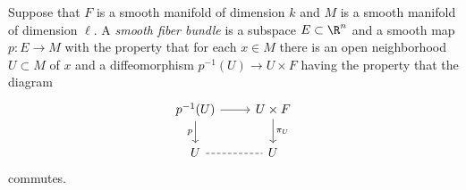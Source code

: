 \documentclass[11pt,letterpaper]{article}
\begin{document}
\begin{problem}
    Suppose that $F$ is a smooth manifold of dimension $k$ and $M$ is a smooth manifold of dimension $\ell$. A \emph{smooth fiber bundle} is a subspace $E\subset \R^n$ and a smooth map $p : E \to M$ with the property that for each $x\in M$ there is an open neighborhood $U\subset M$ of $x$ and a diffeomorphism $p^{-1}(U)\to U\times F$ having the property that the diagram
    \[\begin{tikzcd}[ampersand replacement=\&]
        {p^{-1}(U)} \& {U\times F} \\
        U \& U
        \arrow[from=1-1, to=1-2]
        \arrow[dashed, no head, from=2-1, to=2-2]
        \arrow["p"', from=1-1, to=2-1]
        \arrow["\pi_{U}", from=1-2, to=2-2]
    \end{tikzcd}\]
    commutes.
\end{problem}
\end{document}
